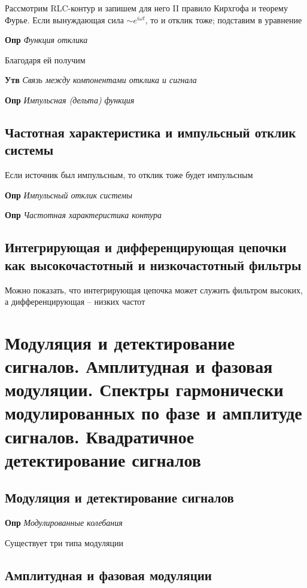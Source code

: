 \documentclass[a4paper, 14pt]{article}
\begin{document}
    Рассмотрим RLC-контур и запишем для него II правило Кирхгофа и теорему Фурье.
    Если вынуждающая сила $\sim e^{i\omega t}$, то и отклик тоже; подставим в уравнение
    
    \textbf{Опр} \textit{Функция отклика}
    
    Благодаря ей получим
    
    \textbf{Утв} \textit{Связь между компонентами отклика и сигнала}
    
    \textbf{Опр} \textit{Импульсная (дельта) функция}
    
    \subsection{Частотная характеристика и импульсный отклик системы}
    
    Если источник был импульсным, то отклик тоже будет импульсным
    
    \textbf{Опр} \textit{Импульсный отклик системы}
    
    \textbf{Опр} \textit{Частотная характеристика контура}
    
    \subsection{Интегрирующая и дифференцирующая цепочки как высокочастотный и низкочастотный фильтры}
    
    Можно показать, что интегрирующая цепочка может служить фильтром высоких, а дифференцирующая -- низких частот
    
    \section{Модуляция и детектирование сигналов.
    Амплитудная и фазовая модуляции.
    Спектры гармонически модулированных по фазе и амплитуде сигналов.
    Квадратичное детектирование сигналов}
    
    \subsection{Модуляция и детектирование сигналов}
    
    \textbf{Опр} \textit{Модулированные колебания}
    
    Существует три типа модуляции
    
    \subsection{Амплитудная и фазовая модуляции}
    
\end{document}
